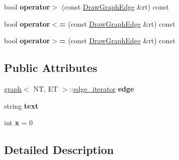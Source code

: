 \begin{DoxyCompactItemize}
\item 
\hypertarget{structGraphingInternals_1_1DrawGraphEdge_a770c68dac507b11e084f671d355aa51b}{bool {\bfseries operator$>$} (const \hyperlink{structGraphingInternals_1_1DrawGraphEdge}{Draw\+Graph\+Edge} \&rt) const }\label{structGraphingInternals_1_1DrawGraphEdge_a770c68dac507b11e084f671d355aa51b}

\item 
\hypertarget{structGraphingInternals_1_1DrawGraphEdge_a440063310fa37ef3533a5041223a8bd8}{bool {\bfseries operator$<$=} (const \hyperlink{structGraphingInternals_1_1DrawGraphEdge}{Draw\+Graph\+Edge} \&rt) const }\label{structGraphingInternals_1_1DrawGraphEdge_a440063310fa37ef3533a5041223a8bd8}

\item 
\hypertarget{structGraphingInternals_1_1DrawGraphEdge_a9a27d32d2ab80cc936cc816d9b339713}{bool {\bfseries operator$>$=} (const \hyperlink{structGraphingInternals_1_1DrawGraphEdge}{Draw\+Graph\+Edge} \&rt) const }\label{structGraphingInternals_1_1DrawGraphEdge_a9a27d32d2ab80cc936cc816d9b339713}

\end{DoxyCompactItemize}
\subsection*{Public Attributes}
\begin{DoxyCompactItemize}
\item 
\hypertarget{structGraphingInternals_1_1DrawGraphEdge_a4d75439edb795681094d4e3e36582caa}{\hyperlink{classgraph}{graph}$<$ N\+T, E\+T $>$\+::\hyperlink{classedge__iterator}{edge\+\_\+iterator} {\bfseries edge}}\label{structGraphingInternals_1_1DrawGraphEdge_a4d75439edb795681094d4e3e36582caa}

\item 
\hypertarget{structGraphingInternals_1_1DrawGraphEdge_a5df5d87890cb8baf7cf9b0fd8cf7b882}{string {\bfseries text}}\label{structGraphingInternals_1_1DrawGraphEdge_a5df5d87890cb8baf7cf9b0fd8cf7b882}

\item 
\hypertarget{structGraphingInternals_1_1DrawGraphEdge_a5d31e0762db1ad4dd2e45dfeaa7cb8f2}{int {\bfseries x} = 0}\label{structGraphingInternals_1_1DrawGraphEdge_a5d31e0762db1ad4dd2e45dfeaa7cb8f2}

\end{DoxyCompactItemize}


\subsection{Detailed Description}
